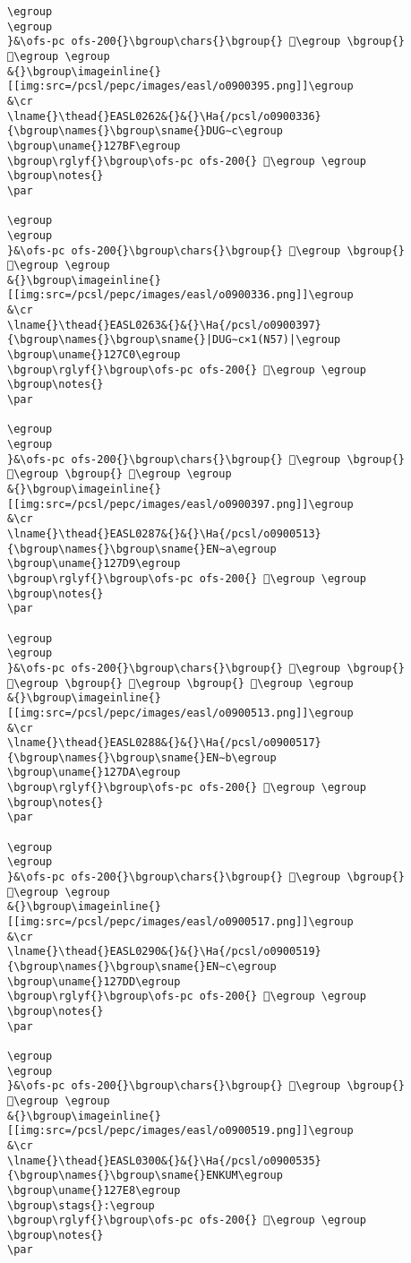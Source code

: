 \begin{verbatim}
\egroup
\egroup
}&\ofs-pc ofs-200{}\bgroup\chars{}\bgroup{} 𒞸\egroup \bgroup{} 𒞪\egroup \egroup
&{}\bgroup\imageinline{}[[img:src=/pcsl/pepc/images/easl/o0900395.png]]\egroup
&\cr
\lname{}\thead{}EASL0262&{}&{}\Ha{/pcsl/o0900336}{\bgroup\names{}\bgroup\sname{}DUG∼c\egroup
\bgroup\uname{}127BF\egroup
\bgroup\rglyf{}\bgroup\ofs-pc ofs-200{} 𒞿\egroup \egroup
\bgroup\notes{}
\par 

\egroup
\egroup
}&\ofs-pc ofs-200{}\bgroup\chars{}\bgroup{} 𒞼\egroup \bgroup{} 𒞿\egroup \egroup
&{}\bgroup\imageinline{}[[img:src=/pcsl/pepc/images/easl/o0900336.png]]\egroup
&\cr
\lname{}\thead{}EASL0263&{}&{}\Ha{/pcsl/o0900397}{\bgroup\names{}\bgroup\sname{}|DUG∼c×1(N57)|\egroup
\bgroup\uname{}127C0\egroup
\bgroup\rglyf{}\bgroup\ofs-pc ofs-200{} 𒟀\egroup \egroup
\bgroup\notes{}
\par 

\egroup
\egroup
}&\ofs-pc ofs-200{}\bgroup\chars{}\bgroup{} 𒞾\egroup \bgroup{} 𒞽\egroup \bgroup{} 𒟀\egroup \egroup
&{}\bgroup\imageinline{}[[img:src=/pcsl/pepc/images/easl/o0900397.png]]\egroup
&\cr
\lname{}\thead{}EASL0287&{}&{}\Ha{/pcsl/o0900513}{\bgroup\names{}\bgroup\sname{}EN∼a\egroup
\bgroup\uname{}127D9\egroup
\bgroup\rglyf{}\bgroup\ofs-pc ofs-200{} 𒟙\egroup \egroup
\bgroup\notes{}
\par 

\egroup
\egroup
}&\ofs-pc ofs-200{}\bgroup\chars{}\bgroup{} 𒟖\egroup \bgroup{} 𒟗\egroup \bgroup{} 𒟘\egroup \bgroup{} 𒟙\egroup \egroup
&{}\bgroup\imageinline{}[[img:src=/pcsl/pepc/images/easl/o0900513.png]]\egroup
&\cr
\lname{}\thead{}EASL0288&{}&{}\Ha{/pcsl/o0900517}{\bgroup\names{}\bgroup\sname{}EN∼b\egroup
\bgroup\uname{}127DA\egroup
\bgroup\rglyf{}\bgroup\ofs-pc ofs-200{} 𒟚\egroup \egroup
\bgroup\notes{}
\par 

\egroup
\egroup
}&\ofs-pc ofs-200{}\bgroup\chars{}\bgroup{} 𒟚\egroup \bgroup{} 𒟜\egroup \egroup
&{}\bgroup\imageinline{}[[img:src=/pcsl/pepc/images/easl/o0900517.png]]\egroup
&\cr
\lname{}\thead{}EASL0290&{}&{}\Ha{/pcsl/o0900519}{\bgroup\names{}\bgroup\sname{}EN∼c\egroup
\bgroup\uname{}127DD\egroup
\bgroup\rglyf{}\bgroup\ofs-pc ofs-200{} 𒟝\egroup \egroup
\bgroup\notes{}
\par 

\egroup
\egroup
}&\ofs-pc ofs-200{}\bgroup\chars{}\bgroup{} 𒟝\egroup \bgroup{} 𒟟\egroup \egroup
&{}\bgroup\imageinline{}[[img:src=/pcsl/pepc/images/easl/o0900519.png]]\egroup
&\cr
\lname{}\thead{}EASL0300&{}&{}\Ha{/pcsl/o0900535}{\bgroup\names{}\bgroup\sname{}ENKUM\egroup
\bgroup\uname{}127E8\egroup
\bgroup\stags{}:\egroup
\bgroup\rglyf{}\bgroup\ofs-pc ofs-200{} 𒟨\egroup \egroup
\bgroup\notes{}
\par 


\end{verbatim}
